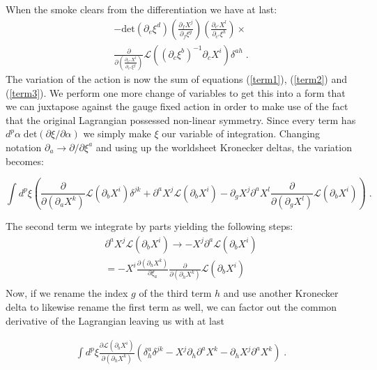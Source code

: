\documentclass[%
 reprint,
 amsmath,amssymb,
 aps,
]{revtex4-1}
\begin{document}
When the smoke clears from the differentiation we have at last:
\begin{eqnarray}
\label{term3}
    - \mathrm{det} ( \partial_e \xi^d )
    \left( \frac{\partial_f X^j}{\partial_f \xi^g} \right)
    \left( \frac{\partial_{c'} X^l}{\partial_{c'} \xi^h} \right) \times \\ \nonumber
    \frac{\partial}{\partial \left(
    \frac{\partial_{c''} X^l}{\partial_{c''} \xi^g} \right)}
    \mathcal{L}\left( (\partial_c \xi^b)^{-1} \partial_c X^i \right) \delta^{a h} \; .
\end{eqnarray}
The variation of the action is now the sum of equations (\ref{term1}), (\ref{term2}) and (\ref{term3}).  We perform one more change
of variables to get this into a form that we can juxtapose against the gauge fixed action in order to
make use of the fact that the original Lagrangian possessed non-linear symmetry.  Since
every term has $d^p \alpha\;\mathrm{det}\left( \partial \xi/\partial \alpha\right)$ we simply make $\xi$
our variable of integration. Changing notation $\partial_a \rightarrow \partial/\partial \xi^a $
and using up the worldsheet Kronecker deltas, the variation becomes:
\begin{widetext}
    \begin{equation}
    \label{diffeq}
        \int d^p \xi \left(
        \frac{\partial}{\partial (\partial_a X^k)} \mathcal{L}
        (\partial_b X^i) \delta^{j k} + \partial^a X^j \mathcal{L}(\partial_b X^i)
        - \partial_g X^j \partial^a X^l \frac{\partial}{\partial (\partial_g X^l)}
        \mathcal{L}(\partial_b X^i) \right) \; .
    \end{equation}
\end{widetext}
The second term we integrate by parts yielding the following steps:
\begin{gather}
    \partial^a X^j \mathcal{L}(\partial_b X^i) \rightarrow - X^j \partial^a \mathcal{L}(\partial_b X^i) \nonumber \\
    = - X^i \frac{\partial (\partial_h X^k)}{\partial \xi_a} \frac{\partial}{\partial (\partial_h X^k)} \mathcal{L}(\partial_b X^i) \nonumber \\
\end{gather}
Now, if we rename the index $g$ of the third term $h$ and use another Kronecker delta to likewise rename the first term as well,
we can factor out the common derivative of the Lagrangian leaving us with at last
\begin{widetext}
    \begin{eqnarray}
        \int d^p \xi \frac{\partial \mathcal{L}(\partial_b X^i)}{\partial \left( \partial_h X^k \right)}
        \left( \delta^a_h \delta^{j k} - X^j \partial_h \partial^a X^k - \partial_h X^j \partial^a X^k \right) \; . \nonumber
    \end{eqnarray}
\end{widetext}
\end{document}
